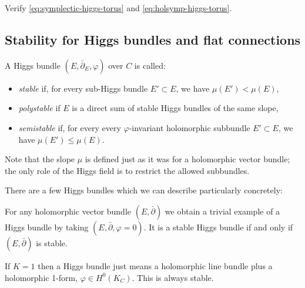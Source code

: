 \documentclass[12pt,letterpaper,reqno]{article}
\numberwithin{equation}{section}
\newcommand{\cM}{\ensuremath{\mathcal M}}
\newcommand{\C}{\ensuremath{\mathbb C}}
\newcommand{\ti}[1]{\textit{#1}}
\begin{document}
\begin{exercise} Verify \eqref{eq:symplectic-higgs-torus} and
\eqref{eq:holsymp-higgs-torus}.
\end{exercise}



\subsection{Stability for Higgs bundles and flat connections}

\begin{defn} A Higgs bundle $(E, \bar\partial_E, \varphi)$ over $C$ is called:
\begin{itemize}
\item \ti{stable} if, for every sub-Higgs bundle $E' \subset E$,
we have $\mu(E') < \mu(E)$,
\item \ti{polystable} if $E$ is a direct sum of stable Higgs bundles
of the same slope,
\item \ti{semistable} if, for every every $\varphi$-invariant 
holomorphic subbundle 
$E' \subset E$, we have $\mu(E') \le \mu(E)$.
\end{itemize}
\end{defn}
Note that the slope $\mu$ is defined just as it was for a holomorphic
vector bundle; the only role of the Higgs field is to restrict
the allowed subbundles.

There are a few Higgs bundles which we can describe particularly
concretely:

\begin{example} For any holomorphic vector
bundle $(E,\bar\partial)$ we obtain a trivial example of a Higgs bundle
by taking $(E,\bar\partial,\varphi=0)$. It is a stable Higgs bundle
if and only if $(E,\bar\partial)$ is stable.
\end{example}

\begin{example} If $K=1$ then a Higgs bundle
just means a holomorphic line bundle plus a holomorphic 1-form,
$\varphi \in H^0(K_C)$. This is always stable.
\end{example}
\end{document}
